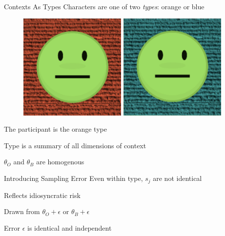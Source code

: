 \documentclass[
  ignorenonframetext,
]{beamer}
\begin{document}
\begin{frame}{Contexts As Types}
\protect\hypertarget{contexts-as-types}{}
Characters are one of two \emph{types}: orange or blue

\begin{figure}

\begin{minipage}[c]{0.50\linewidth}

{\centering 

\includegraphics[width=2.08333in,height=\textheight]{orange_type.png}

}

\end{minipage}%
%
\begin{minipage}[c]{0.50\linewidth}

{\centering 

\includegraphics[width=2.08333in,height=\textheight]{blue_type.png}

}

\end{minipage}%

\end{figure}

The participant is the orange type

Type is a summary of all dimensions of context

\(\theta_O\) and \(\theta_B\) are homogenous
\end{frame}

\begin{frame}{Introducing Sampling Error}
\protect\hypertarget{introducing-sampling-error}{}
Even within type, \(s_j\) are not identical

Reflects idiosyncratic risk

Drawn from \(\theta_O + \epsilon\) or \(\theta_B + \epsilon\)

Error \(\epsilon\) is identical and independent
\end{frame}
\end{document}
